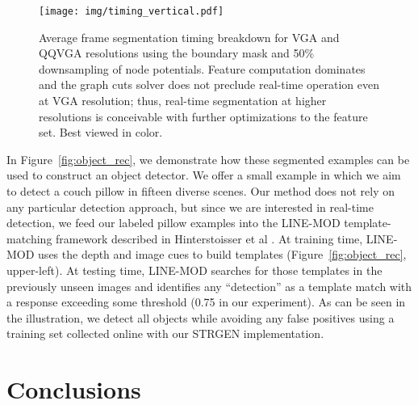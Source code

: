\documentclass[journal]{IEEEtran}
\newcommand{\vga}{VGA\xspace}
\newcommand{\qqvga}{QQVGA\xspace}
\newcommand{\todoCR}[1]{}
\begin{document}
\todoCR{We should report how many frames were in the training set and how many clicks were necessary.  It'd be much better if we could do the viewpoint variation thing so that the number is very small.}

\begin{figure}
  \centering
  \texttt{[image: img/timing\_vertical.pdf]}
  \caption{Average frame segmentation timing breakdown for \vga and \qqvga resolutions using the boundary mask and 50\% downsampling of node potentials.  Feature computation dominates and the graph cuts solver does not preclude real-time operation even at \vga resolution; thus, real-time segmentation at higher resolutions is conceivable with further optimizations to the feature set. Best viewed in color. \todoCR{Should probably collect a 640x480 dataset, make a scaled-down copy, and compute timing results for that data.  This way, you can make an exact comparison.  As it is, the two sets of sequences are not exactly the same.  The reported claims are supported by the current plot, but it'd be nice for one to be able to make the comparison between the two total times.}}
  \label{fig:timing}
\end{figure}

In Figure~\ref{fig:object_rec}, we demonstrate how these segmented examples can be used to construct an object detector.  We offer a small example in which we aim to detect a couch pillow in fifteen diverse scenes. Our method does not rely on any particular detection approach, but since we are interested in real-time detection, we feed our labeled pillow examples into the LINE-MOD template-matching framework described in Hinterstoisser et al \cite{hinterstoisser2011a}. At training time, LINE-MOD uses the depth and image cues to build templates (Figure~\ref{fig:object_rec}, upper-left). At testing time, LINE-MOD searches for those templates in the previously unseen images and identifies any ``detection'' as a template match with a response exceeding some threshold (0.75 in our experiment).  As can be seen in the illustration, we detect all objects while avoiding any false positives using a training set collected online with our STRGEN implementation.

\section{Conclusions}
\end{document}
